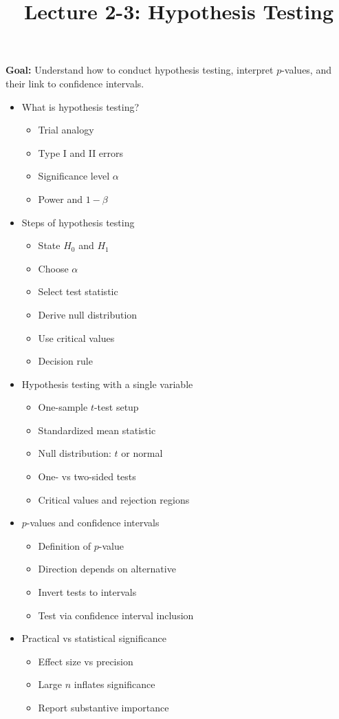 \documentclass[12pt]{article}
\title{\Large Lecture 2-3: Hypothesis Testing}
\author{}
\date{}
\begin{document}
\maketitle
\vspace{-6em}

\noindent \textbf{Goal:} Understand how to conduct hypothesis testing, interpret $p$-values, and their link to confidence intervals.\medskip

\begin{itemize}\setlength{\itemsep}{1em}
\item What is hypothesis testing?
\begin{itemize}
\item Trial analogy
\item Type I and II errors
\item Significance level $\alpha$
\item Power and $1-\beta$
\end{itemize}
\item Steps of hypothesis testing
\begin{itemize}
\item State $H_0$ and $H_1$
\item Choose $\alpha$
\item Select test statistic
\item Derive null distribution
\item Use critical values
\item Decision rule
\end{itemize}
\item Hypothesis testing with a single variable
\begin{itemize}
\item One-sample $t$-test setup
\item Standardized mean statistic
\item Null distribution: $t$ or normal
\item One- vs two-sided tests
\item Critical values and rejection regions
\end{itemize}
\item $p$-values and confidence intervals
\begin{itemize}
\item Definition of $p$-value
\item Direction depends on alternative
\item Invert tests to intervals
\item Test via confidence interval inclusion
\end{itemize}
\item Practical vs statistical significance
\begin{itemize}
\item Effect size vs precision
\item Large $n$ inflates significance
\item Report substantive importance
\end{itemize}
\end{itemize}
\end{document}
